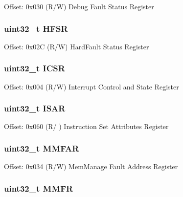 Offset\-: 0x030 (R/\-W) Debug Fault Status Register \hypertarget{struct_s_c_b___type_a87aadbc5e1ffb76d755cf13f4721ae71}{
\subsubsection[{H\-F\-S\-R}]{ uint32\-\_\-t H\-F\-S\-R}}\label{struct_s_c_b___type_a87aadbc5e1ffb76d755cf13f4721ae71}
Offset\-: 0x02\-C (R/\-W) Hard\-Fault Status Register \hypertarget{struct_s_c_b___type_a8fec9e122b923822e7f951cd48cf1d47}{
\subsubsection[{I\-C\-S\-R}]{ uint32\-\_\-t I\-C\-S\-R}}\label{struct_s_c_b___type_a8fec9e122b923822e7f951cd48cf1d47}
Offset\-: 0x004 (R/\-W) Interrupt Control and State Register \hypertarget{struct_s_c_b___type_abdeaebf965a4ca1dfde816cab85f1156}{
\subsubsection[{I\-S\-A\-R}]{ uint32\-\_\-t I\-S\-A\-R}}\label{struct_s_c_b___type_abdeaebf965a4ca1dfde816cab85f1156}
Offset\-: 0x060 (R/ ) Instruction Set Attributes Register \hypertarget{struct_s_c_b___type_a88820a178974aa7b7927155cee5c47ed}{
\subsubsection[{M\-M\-F\-A\-R}]{ uint32\-\_\-t M\-M\-F\-A\-R}}\label{struct_s_c_b___type_a88820a178974aa7b7927155cee5c47ed}
Offset\-: 0x034 (R/\-W) Mem\-Manage Fault Address Register \hypertarget{struct_s_c_b___type_a037095d7dc8c30536cab793e28329c45}{
\subsubsection[{M\-M\-F\-R}]{ uint32\-\_\-t M\-M\-F\-R}}\label{struct_s_c_b___type_a037095d7dc8c30536cab793e28329c45}
